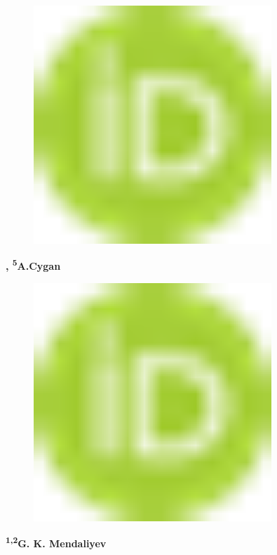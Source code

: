 \begin{figure}[H]
	\centering
	\includegraphics[width=0.8\textwidth]{media/chem2/image1}
	\caption*{}
\end{figure}
{\bfseries ,
\textsuperscript{5}A.Cygan}

\begin{figure}[H]
	\centering
	\includegraphics[width=0.8\textwidth]{media/chem2/image1}
	\caption*{}
\end{figure}


{\bfseries \textsuperscript{1,2}G. K. Mendaliyev}


